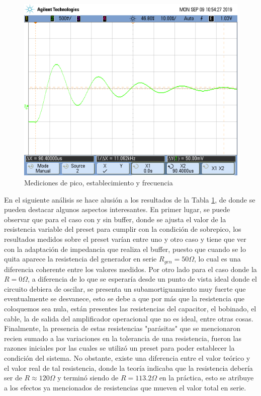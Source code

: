 \begin{figure}[H]
    \includegraphics[scale=0.2]{../Mediciones/Osciloscopio/Pasabajos_respuesta_caso_0/scope_11.png} 
    \caption{Mediciones de pico, establecimiento y frecuencia}
    \label{fig:transitorio_pasabajos}
\end{figure}

En el siguiente an\'alisis se hace alusi\'on a los resultados de la Tabla \ref{fig:transitorio_pasabajos}, de donde se pueden destacar algunos aspectos interesantes. En primer lugar,
se puede observar que para el caso con y sin buffer, donde se ajusta el valor de la resistencia variable del preset para cumplir con la condici\'on de 
sobrepico, los resultados medidos sobre el preset var\'ian entre uno y otro caso y tiene que ver con la adaptaci\'on de impedancia que realiza el buffer,
puesto que cuando se lo quita aparece la resistencia del generador en serie $R_{gen} = 50 \Omega$, lo cual es una diferencia coherente entre los valores medidos.
Por otro lado para el caso donde la $R = 0 \Omega$, a diferencia de lo que se esperar\'ia desde un punto de vista ideal donde el circuito debiera de oscilar,
se presenta un subamortiguamiento muy fuerte que eventualmente se desvanece, esto se debe a que por m\'as que la resistencia que coloquemos sea nula, est\'an presentes
las resistencias del capacitor, el bobinado, el cable, la de salida del amplificador operacional que no es ideal, entre otras cosas.
Finalmente, la presencia de estas resistencias "par\'asitas" que se mencionaron recien sumado a las variaciones en la tolerancia de una resistencia, fueron las razones iniciales por las cuales
se utiliz\'o un preset para poder establecer la condici\'on del sistema. No obstante, existe una diferencia entre el valor te\'orico y el valor real de tal resistencia, donde la teor\'ia indicaba
que la resistencia deber\'ia ser de $R \approx 120 \Omega$ y termin\'o siendo de $R = 113.2 \Omega$ en la pr\'actica, esto se atribuye a los efectos ya mencionados de resistencias que mueven el valor total
en serie.


